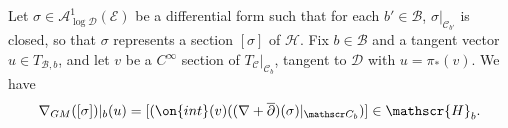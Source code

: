 \begin{lemma}
\notready
	\label{lemma:connection-to-interior}
	Let $\sigma\in \mathcal A^1_{\log \mathscr{D}}(\mathscr{E})$ be a
	differential form such that for each $b'\in \mathscr{B}$,
	$\sigma|_{\mathscr{C}_{b'}}$ is closed, so that $\sigma$ represents a
	section $[\sigma]$ of $\mathscr{H}$.
Fix $b\in \mathscr{B}$ and a tangent vector $u\in T_{\mathscr{B}, b}$, and let
$v$ be a $C^\infty$ section of $T_\mathscr{C}|_{\mathscr{C}_b}$, tangent to
$\mathscr{D}$ with $u = \pi_*(v).$
	We have
	\begin{align*}
		\nabla_{GM}([\sigma])|_b(u)= [(\on{int}(v)((\nabla+\overline{\partial})
	(\sigma)|_{\mathscr C_b})]\in \mathscr{H}_b.
	\end{align*}
\end{lemma}
